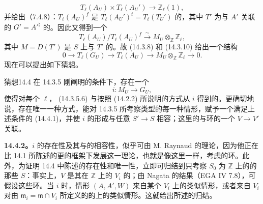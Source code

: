 \begin{equation}\tag{14.3.5.4}
T_\ell(A_U)\times T_\ell(A_U')\longrightarrow\mathbb Z_\ell(1),
\end{equation}
并给出（7.4.8）：$T_\ell(A_U)^f$ 是 $T_\ell(A_U')^t=T_\ell(T_U')$ 的，其中 $T'$ 为与 $A'$ 关联的 $G'=A'^\natural$ 的。因此又得到一个
\begin{equation}\tag{14.3.5.5}
T_\ell(A_U)/T_\ell(A_U)^f\xrightarrow\sim M_U\otimes_{\mathbb Z}\mathbb Z_\ell,
\end{equation}
其中 $M=D(T')$ 是 $S$ 上与 $T'$ 的。故 (14.3.8) 和 (14.3.10) 给出一个结构
\begin{equation}\tag{14.3.5.6}
0\longrightarrow T_\ell(G_U)\longrightarrow T_\ell(A_U)
\longrightarrow M_U\otimes_{\mathbb Z}\mathbb Z_\ell\longrightarrow0.
\end{equation}
现在可以提出如下猜想。

\begin{SGAresult}{猜想}{14.4}
在 14.3.5 刚阐明的条件下，存在一个
\begin{equation}\tag{14.4.1}
i:M_U\longrightarrow G_U,
\end{equation}
使得对每个 $\ell$， (14.3.5.6) 与按照 (14.2.2) 所说明的方式从 $i$ 得到的。更确切地说，存在唯一一种方式，能对 14.3.5 所考察类型的每一种情形，赋予一个满足上述条件的 (14.4.1)，并使 $i$ 的形成与任意 $S'\to S$ 相容；这里的与环的一个 $V\to V'$ 关联。
\end{SGAresult}

\textbf{14.4.2。}$i$ 的存在性及其与的相容性，似乎可由 M. Raynaud 的理论，因为他正在比 14.1 所陈述的更的框架下发展这一理论，也就是像这里一样，考虑的环。此外，为证明 14.4 中陈述的存在性和唯一性，立即可归结到只考察 $S_0$ 为 $\mathbb Z$ 上的的那些 $S$：事实上，$V$ 是其在 $\mathbb Z$ 上的 $V_i$ 的；由 Nagata 的结果（EGA IV 7.8），可假设这些环。当 $i$ 时，情形 $(A,A',W)$ 来自某个 $V_i$ 上的类似情形，或者来自 $V_i$ 对由 $\mathfrak m_i=\mathfrak m\cap V_i$ 所定义的的上的类似情形。这就给出所述的归结。

